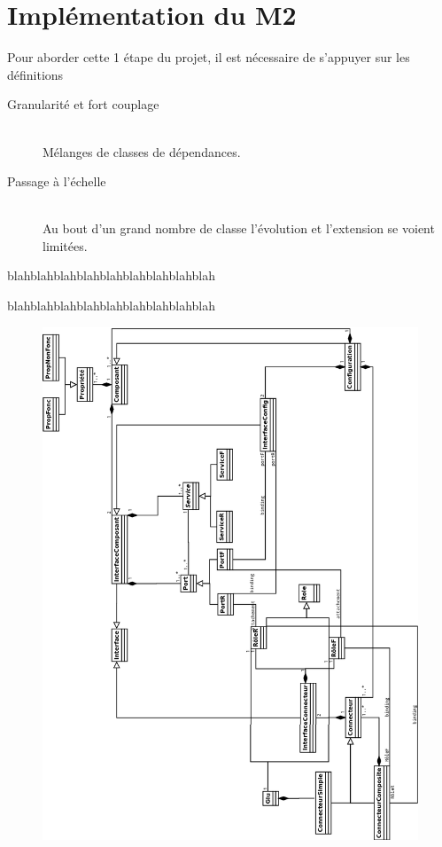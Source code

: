 \chapter{Implémentation du M2}

Pour aborder cette 1 étape du projet, il est nécessaire de s'appuyer sur les définitions

\begin{description}
\item[Granularité et fort couplage] \hfill \\
  Mélanges de classes de dépendances.
\item[Passage à l'échelle] \hfill \\
  Au bout d'un grand nombre de classe l'évolution et l'extension se voient limitées.
\end{description}


blahblahblahblahblahblahblahblahblah

blahblahblahblahblahblahblahblahblah
\begin{figure}[htb]
\includegraphics[scale=0.31]{img/M2}
\end{figure}
